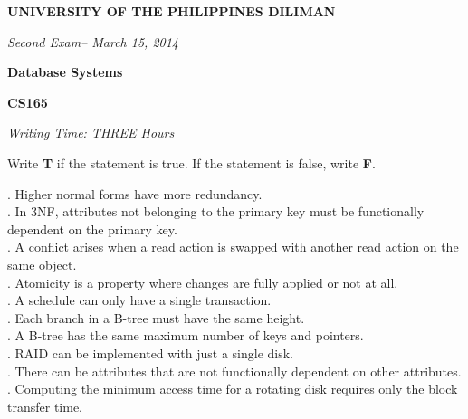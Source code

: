 \documentclass[a4paper,10pt,leqno]{article}
\newcommand{\institution}{UNIVERSITY OF THE PHILIPPINES DILIMAN}
\newcommand{\titlehd}{Database Systems}
\newcommand{\examtype}{Second Exam}
\newcommand{\examdate}{March 15, 2014}
\newcommand{\examcode}{CS165}
\newcommand{\writetime}{THREE Hours}
\begin{document}

\begin{center}
\large\textbf{\institution}
\end{center}
\vspace{1cm}

\begin{center}
\textit{ \examtype -- \examdate}
\end{center}
\vspace{1cm}

\begin{center}
\large\textbf{\titlehd}
\end{center}

\begin{center}
\large\textbf{\examcode}
\end{center}
\vspace{4cm}

\begin{center}
\textit{Writing Time:  \writetime}
\end{center}


\newpage
{}
\noindent Write {\textbf T} if the statement is true. If the statement is false, write {\textbf F}.

. Higher normal forms have more redundancy. \\
. In 3NF, attributes not belonging to the primary key must be functionally dependent on the primary key. \\
. A conflict arises when a read action is swapped with another read action on the same object. \\
. Atomicity is a property where changes are fully applied or not at all. \\
. A schedule can only have a single transaction. \\
. Each branch in a B-tree must have the same height. \\
. A B-tree has the same maximum number of keys and pointers. \\
. RAID can be implemented with just a single disk. \\
. There can be attributes that are not functionally dependent on other attributes. \\
. Computing the minimum access time for a rotating disk requires only the block transfer time. 
\end{document}
